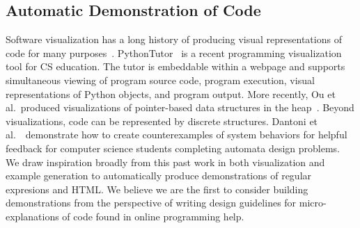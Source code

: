 \subsection{Automatic Demonstration of Code}

Software visualization has a long history of producing visual representations of code for many purposes~\cite{sorva_visual_2012}.
PythonTutor~\cite{guo_online_2013} is a recent programming visualization tool for CS education.
The tutor is embeddable within a webpage and supports simultaneous viewing of program source code, program execution, visual representations of Python objects, and program output.
More recently, Ou et al.\ produced visualizations of pointer-based data structures in the heap~\cite{ou_interactive_2015}.
Beyond visualizations, code can be represented by discrete structures.
Dantoni et al.~\cite{dantoni_how_2015}\ demonstrate how to create counterexamples of system behaviors for helpful feedback for computer science students completing automata design problems.
We draw inspiration broadly from this past work in both visualization and example generation to automatically produce demonstrations of regular expresions and HTML\@.
We believe we are the first to consider building demonstrations from the perspective of writing design guidelines for micro-explanations of code found in online programming help.
